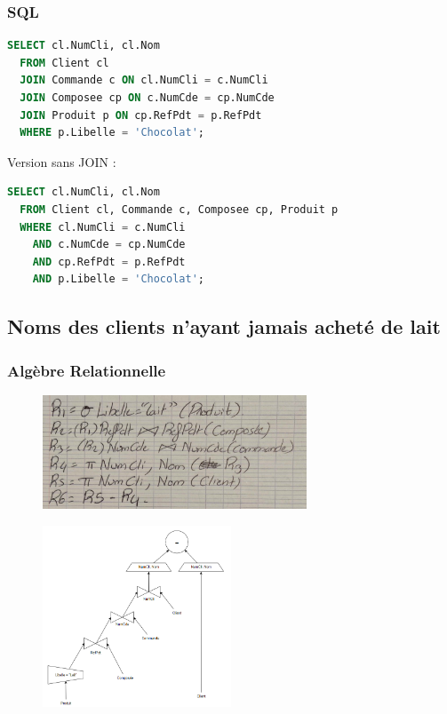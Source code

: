 \documentclass{article}
\begin{document}
\subsubsection{SQL}

\begin{lstlisting}[language=SQL]
  SELECT cl.NumCli, cl.Nom 
  FROM Client cl
  JOIN Commande c ON cl.NumCli = c.NumCli
  JOIN Composee cp ON c.NumCde = cp.NumCde
  JOIN Produit p ON cp.RefPdt = p.RefPdt
  WHERE p.Libelle = 'Chocolat';
\end{lstlisting}

Version sans JOIN :

\begin{lstlisting}[language=SQL]
  SELECT cl.NumCli, cl.Nom 
  FROM Client cl, Commande c, Composee cp, Produit p
  WHERE cl.NumCli = c.NumCli 
    AND c.NumCde = cp.NumCde 
    AND cp.RefPdt = p.RefPdt 
    AND p.Libelle = 'Chocolat';
\end{lstlisting}

\subsection{Noms des clients n’ayant jamais acheté de lait}

\subsubsection{Algèbre Relationnelle}

\begin{figure}[H]
  \centering
  \includegraphics[width=0.7\textwidth]{alg/8.png}
  \label{fig:alg-rel}
\end{figure}

\begin{figure}[H]
  \centering
  \includegraphics[width=0.5\textwidth]{algRel/8.png}
  \label{fig:alg-rel}
\end{figure}
\end{document}
